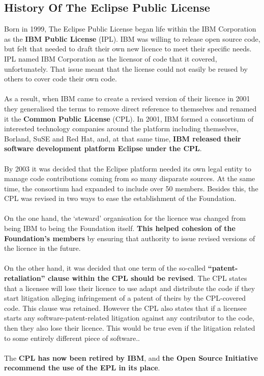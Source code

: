 \documentclass[a4paper, 12pt]{book}
\begin{document}
\subsection{History Of The Eclipse Public License}
Born in 1999, The Eclipse Public License began life within the IBM Corporation as the \textbf{IBM Public License} (IPL). IBM was willing to release open source code, but felt that needed to draft their own new licence to meet their specific needs. IPL named IBM Corporation as the licensor of code that it covered, unfortunately. That issue meant that the license could not easily be reused by others to cover code their own code.\\
\\
As a result, when IBM came to create a revised version of their licence in 2001 they generalised the terms to remove direct reference to themselves and renamed it the \textbf{Common Public License} (CPL). In 2001, IBM formed a consortium of interested technology companies around the platform including themselves, Borland, SuSE and Red Hat, and, at that same time, \textbf{IBM released their software development platform Eclipse under the CPL}.\\
\\
By 2003 it was decided that the Eclipse platform needed its own legal entity to manage code contributions coming from so many disparate sources. At the same time, the consortium had expanded to include over 50 members. Besides this, the CPL was revised in two ways to ease the establishment of the Foundation.\\
\\
On the one hand, the ‘steward’ organisation for the licence was changed from being IBM to being the Foundation itself. \textbf{This helped cohesion of the Foundation’s members} by ensuring that authority to issue revised versions of the licence in the future.\\
\\
On the other hand, it was decided that one term of the so-called \textbf{``patent-retaliation'' clause within the CPL should be revised}. The CPL states that a licensee will lose their licence to use adapt and distribute the code if they start litigation alleging infringement of a patent of theirs by the CPL-covered code. This clause was retained. However the CPL also states that if a licensee starts any software-patent-related litigation against any contributor to the code, then they also lose their licence. This would be true even if the litigation related to some entirely different piece of software..\\
\\
The \textbf{CPL has now been retired by IBM}, and \textbf{the Open Source Initiative recommend the use of the EPL in its place}.
\end{document}
